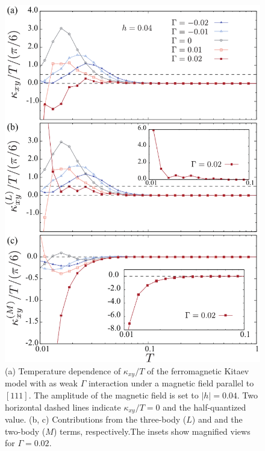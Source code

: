 \documentclass[reprint,amsmath,amssymb,aps,prx]{revtex4-2}
\begin{document}
\begin{figure}
  \begin{center}
    \includegraphics[width=0.9\linewidth]{plot_k_all_h0.04_G.pdf}
  \end{center}
  \caption{(a) Temperature dependence of $\kappa_{xy}/T$ of the ferromagnetic Kitaev model with as weak $\Gamma$ interaction under a magnetic field parallel to $[111]$. The amplitude of the magnetic field is set to $|h|=0.04$. Two horizontal dashed lines indicate $\kappa_{xy}/T = 0$ and the half-quantized value. (b, c) Contributions from the three-body ($L$) and and the two-body ($M$) terms, respectively.The insets show magnified views for $\Gamma = 0.02$.}
  \label{fig:k_all_h0.04_G}
\end{figure}
\end{document}
